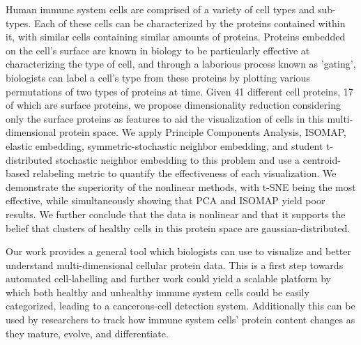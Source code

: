 \documentclass{article}
\begin{document}
Human immune system cells are comprised of a variety of cell types and sub-types. Each of these cells can be characterized by the proteins contained within it, with similar cells containing similar amounts of proteins. Proteins embedded on the cell's surface are known in biology to be particularly effective at characterizing the type of cell, and through a laborious process known as 'gating', biologists can label a cell's type from these proteins by plotting various permutations of two types of proteins at time. Given 41 different cell proteins, 17 of which are surface proteins, we propose dimensionality reduction considering only the surface proteins as features to aid the visualization of cells in this multi-dimensional protein space. We apply Principle Components Analysis, ISOMAP, elastic embedding, symmetric-stochastic neighbor embedding, and student t-distributed stochastic neighbor embedding to this problem and use a centroid-based relabeling metric to quantify the effectiveness of each visualization. We demonstrate the superiority of the nonlinear methods, with t-SNE being the most effective, while simultaneously showing that PCA and ISOMAP yield poor results. We further conclude that the data is nonlinear and that it supports the belief that clusters of healthy cells in this protein space are gaussian-distributed. 

Our work provides a general tool which biologists can use to visualize and better understand multi-dimensional cellular protein data. This is a first step towards automated cell-labelling and further work could yield a scalable platform by which both healthy and unhealthy immune system cells could be easily categorized, leading to a cancerous-cell detection system. Additionally this can be used by researchers to track how immune system cells' protein content changes as they mature, evolve, and differentiate. 

\end{document}

